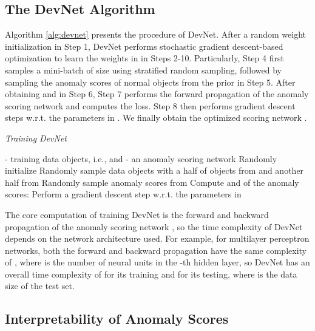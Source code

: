 \documentclass[sigconf]{acmart}
\begin{document}
\subsection{The DevNet Algorithm}\label{sec:algo}

Algorithm \ref{alg:devnet} presents the procedure of DevNet. After a random weight initialization in Step 1, DevNet performs stochastic gradient descent-based optimization to learn the weights in  in Steps 2-10. Particularly, Step 4 first samples a mini-batch  of size  using stratified random sampling, followed by sampling the anomaly scores of  normal objects from the prior  in Step 5. After obtaining  and  in Step 6, Step 7 performs the forward propagation of the anomaly scoring network and computes the loss. Step 8 then performs gradient descent steps w.r.t. the parameters in . We finally obtain the optimized scoring network .

\renewcommand{\algorithmicrequire}{\textbf{Input:}}
\renewcommand{\algorithmicensure}{\textbf{Output:}}
\begin{algorithm}
\small 
\caption{\textit{Training DevNet}}
\begin{algorithmic}[1]
\label{alg:devnet}
\REQUIRE  - training data objects, i.e.,  and  
\ENSURE  - an anomaly scoring network
\STATE Randomly initialize 
        \STATE  Randomly sample  data objects with a half of objects from  and another half from 
        \STATE Randomly sample  anomaly scores from 
        \STATE Compute  and  of the  anomaly scores: 
        \STATE     
        \STATE Perform a gradient descent step w.r.t. the parameters in 
    \ENDFOR
\ENDFOR
\RETURN 
\end{algorithmic}
\end{algorithm}

The core computation of training DevNet is the forward and backward propagation of the anomaly scoring network , so the time complexity of DevNet depends on the network architecture used. For example, for multilayer perceptron networks, both the forward and backward propagation have the same complexity of , where  is the number of neural units in the -th hidden layer, so DevNet has an overall time complexity of  for its training and  for its testing, where  is the data size of the test set.



\subsection{Interpretability of Anomaly Scores}
\end{document}
